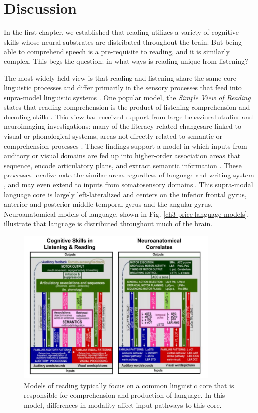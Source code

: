 \chapter{Discussion}

In the first chapter, we established that reading utilizes a variety of cognitive skills whose neural substrates are distributed throughout the brain. But being able to comprehend speech is a pre-requisite to reading, and it is similarly complex. This begs the question: in what ways is reading unique from listening?

The most widely-held view is that reading and listening share the same core linguistic processes and differ primarily in the sensory processes that feed into supra-model linguistic systems \citep{Mattingly1971, Price2012}. One popular model, the \textit{Simple View of Reading} states that reading comprehension is the product of listening comprehension and decoding skills \citep{Gough1986}. This view has received support from large behavioral studies \citep{Kirby2008} and neuroimaging investigations: many of the literacy-related changesare linked to visual or phonological systems, areas not directly related to semantic or comprehension processes \citep{Schlaggar2007, Dehaene2015}. These findings support a model in which inputs from auditory or visual domains are fed up into higher-order association areas that sequence, encode articulatory plans, and extract semantic information \citep{Price2012}. These processes localize onto the similar areas regardless of language and writing system \citep{Rueckl2016}, and may even extend to inputs from somatosensory domains \citep{Xu2005, Sood2016}. This supra-modal language core is largely left-lateralized and centers on the inferior frontal gyrus, anterior and posterior middle temporal gyrus and the angular gyrus. Neuroanatomical models of language, shown in Fig. \ref{ch3-price-language-models}, illustrate that language is distributed throughout much of the brain. 

\begin{figure}[t]
	\centering
	\includegraphics[height=3in]{images/ch3-price-language-models.jpg}
	\caption[Schematics of skills and brain areas used in reading.]{Models of reading typically focus on a common linguistic core that is responsible for comprehension and production of language. In this model, differences in modality affect input pathways to this core.}
	\label{fig:ch3-price-language-models}
\end{figure}

